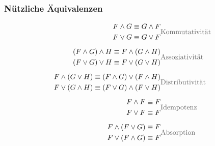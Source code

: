 \documentclass{beamer}
\begin{document}
	
	\begin{frame}\frametitle{Nützliche Äquivalenzen}
		\small
		\begin{align*}
			\begin{split}
				F\wedge G & \equiv G\wedge F\\
				F\vee G & \equiv G\vee F
			\end{split}
			& \text{\textcolor{devilscss}{Kommutativität}} \\[1ex]
			\begin{split}
				(F\wedge G)\wedge H & \equiv F\wedge (G\wedge H)\\
				(F\vee G)\vee H & \equiv F\vee (G\vee H)
			\end{split}
			& \text{\textcolor{devilscss}{Assoziativität}} \\[1ex]
			\begin{split}
				F\wedge (G\vee H) & \equiv (F\wedge G) \vee (F\wedge H)\\
				F\vee (G\wedge H) & \equiv (F\vee G)\wedge (F\vee H)
			\end{split}
			& \text{\textcolor{devilscss}{Distributivität}} \\[1ex]
			\begin{split}
				F\wedge F & \equiv F\\
				F\vee F & \equiv F
			\end{split}
			& \text{\textcolor{devilscss}{Idempotenz}} \\[1ex]
			\begin{split}
				F\wedge (F\vee G) & \equiv F\\
				F\vee (F\wedge G) & \equiv F
			\end{split}
			& \text{\textcolor{devilscss}{Absorption}}
		\end{align*}
		
	\end{frame}
	
\end{document}
